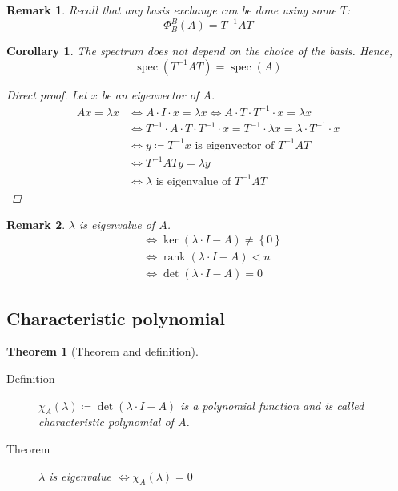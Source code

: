 \documentclass[a4paper]{article}
\newcounter{lecref}[section]
\numberwithin{lecref}{section}
\newtheorem{theorem}[lecref]{Theorem}
\newtheorem*{Remark}{Remark}
\newtheorem{corollary}[lecref]{Corollary}
\newcommand{\set}[1]{\left\{#1\right\}}
\DeclareMathOperator{\rank}{rank}
\begin{document}
\begin{Remark}
  Recall that any basis exchange can be done using some $T$:
  \[ \Phi_B^B(A) = T^{-1} A T \]
\end{Remark}

\begin{corollary}
  The spectrum does not depend on the choice of the basis. Hence,
  \[ \operatorname{spec}(T^{-1} AT) = \operatorname{spec}(A) \]

  \begin{proof}[Direct proof]
    Let $x$ be an eigenvector of $A$.
    \begin{align*}
      Ax = \lambda x &\iff A \cdot I \cdot x = \lambda x \iff A \cdot T \cdot T^{-1} \cdot x = \lambda x \\
                     &\iff T^{-1} \cdot A \cdot T \cdot T^{-1} \cdot x = T^{-1} \cdot \lambda x = \lambda \cdot T^{-1} \cdot x \\
                     &\iff y \coloneqq T^{-1} x \text{ is eigenvector of } T^{-1} AT \\
                     &\iff T^{-1} AT y = \lambda y \\
                     &\iff \lambda \text{ is eigenvalue of } T^{-1} AT
    \end{align*}
  \end{proof}
\end{corollary}

\begin{Remark}
  $\lambda$ is eigenvalue of $A$.
  \begin{align*}
    &\iff \ker(\lambda \cdot I - A) \neq \set{0} \\
    &\iff \rank(\lambda \cdot I - A) < n \\
    &\iff \det(\lambda \cdot I - A) = 0
  \end{align*}
\end{Remark}

\subsection{Characteristic polynomial}

\begin{theorem}[Theorem and definition] \hfill{} %
  \begin{description}
    \item[Definition] $\chi_A(\lambda) \coloneqq \det(\lambda \cdot I - A)$ is a polynomial function and is called \emph{characteristic polynomial of $A$}.
    \item[Theorem] $\lambda$ is eigenvalue $\iff \chi_A(\lambda) = 0$
  \end{description}
\end{theorem}
\end{document}
